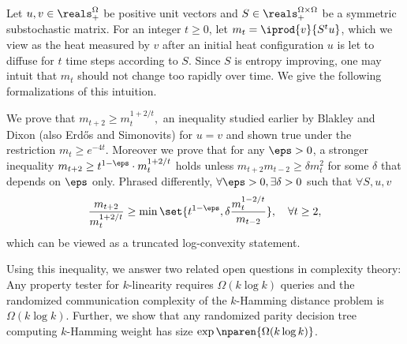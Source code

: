 \renewenvironment{abstract}{\small \list{}{%
    \setlength{\leftmargin}{5mm}%
    \setlength{\rightmargin}{\leftmargin}%
    \listparindent 0em%
  }\item{}}{\endlist}

\begin{abstract}
Let $u,v \in \reals^\Omega_+$ be positive
unit vectors and
$S\in\reals^{\Omega\times\Omega}_+$ be a
symmetric substochastic matrix.
For an integer $t\ge 0$, let 
$m_t = \smash{\iprod{v}{S^tu}}$, which
we view as the
heat measured by $v$ after an initial heat
configuration $u$ is let to diffuse for $t$
time steps according to $S$. 
Since $S$ is entropy improving,
one may intuit that $m_t$ should not change too
rapidly over time. We give the following formalizations
of this intuition.

We prove that
$m_{t+2} \ge m_t^{1+2/t}\!,$ an inequality
studied earlier by Blakley and Dixon 
(also Erdős and Simonovits) for $u=v$
and shown true under the restriction $m_t\ge e^{-4t}$.
Moreover we prove that for any $\eps>0$, 
a stronger inequality 
$m_{t+2} \ge t^{1-\eps}\cdot \smash{m_t^{1+2/t}}$
holds unless
$m_{t+2}m_{t-2}\ge \delta m_t^2$
for some $\delta$ that depends on $\eps$ only.
Phrased differently, $\forall \eps> 0, 
\exists \delta> 0$ such that $\forall S,u,v$
\begin{equation*}
\frac{m_{t+2}}{m_{t}^{1+2/t}}\ge
\min\set{t^{1-\eps}, \delta\frac{m_t^{1-2/t}}{m_{t-2}}},
\quad \forall t \ge 2,
\end{equation*}
which can be viewed as a truncated 
log-convexity statement. 

Using this inequality, we answer two related
open questions in complexity theory: Any
property tester for $k$-linearity requires
$\Omega(k\log k)$ queries and the randomized
communication complexity of the $k$-Hamming
distance problem is $\Omega(k\log k)$.
Further, we show that any randomized parity
decision tree computing $k$-Hamming weight has size
$\exp\nparen{\Omega(k\log k)}$.
\end{abstract}
